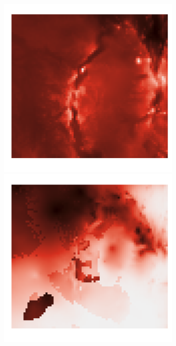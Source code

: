 \documentclass{article}
\begin{document}
\begin{figure}
\begin{subfigure}{0.3\textwidth}
 	\end{subfigure}
 	\begin{subfigure}{0.3\textwidth}
 		\includegraphics[width=\linewidth]{figures/p_real1}\\
 		\includegraphics[width=\linewidth]{figures/p_real2}\\

\end{subfigure}
\end{figure}
\end{document}
